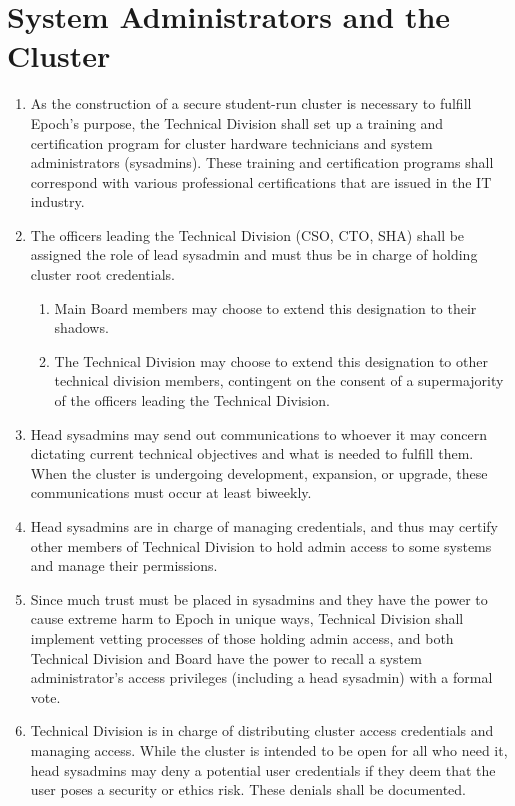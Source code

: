 \documentclass{article}
\begin{document}
\section{System Administrators and the Cluster}
\begin{enumerate}
    \item As the construction of a secure student-run cluster is necessary to fulfill Epoch's purpose, the Technical Division shall set up a training and certification program for cluster hardware technicians and system administrators (sysadmins). These training and certification programs shall correspond with various professional certifications that are issued in the IT industry.
    \item The officers leading the Technical Division (CSO, CTO, SHA) shall be assigned the role of lead sysadmin and must thus be in charge of holding cluster root credentials.
    \begin{enumerate}
        \item Main Board members may choose to extend this designation to their shadows.
        \item The Technical Division may choose to extend this designation to other technical division members, contingent on the consent of a supermajority of the officers leading the Technical Division.
    \end{enumerate}
    \item Head sysadmins may send out communications to whoever it may concern dictating current technical objectives and what is needed to fulfill them. When the cluster is undergoing development, expansion, or upgrade, these communications must occur at least biweekly.
    \item Head sysadmins are in charge of managing credentials, and thus may certify other members of Technical Division to hold admin access to some systems and manage their permissions.
    \item Since much trust must be placed in sysadmins and they have the power to cause extreme harm to Epoch in unique ways, Technical Division shall implement vetting processes of those holding admin access, and both Technical Division and Board have the power to recall a system administrator's access privileges (including a head sysadmin) with a formal vote.
    \item Technical Division is in charge of distributing cluster access credentials and managing access. While the cluster is intended to be open for all who need it, head sysadmins may deny a potential user credentials if they deem that the user poses a security or ethics risk. These denials shall be documented.

\end{enumerate}
\end{document}
